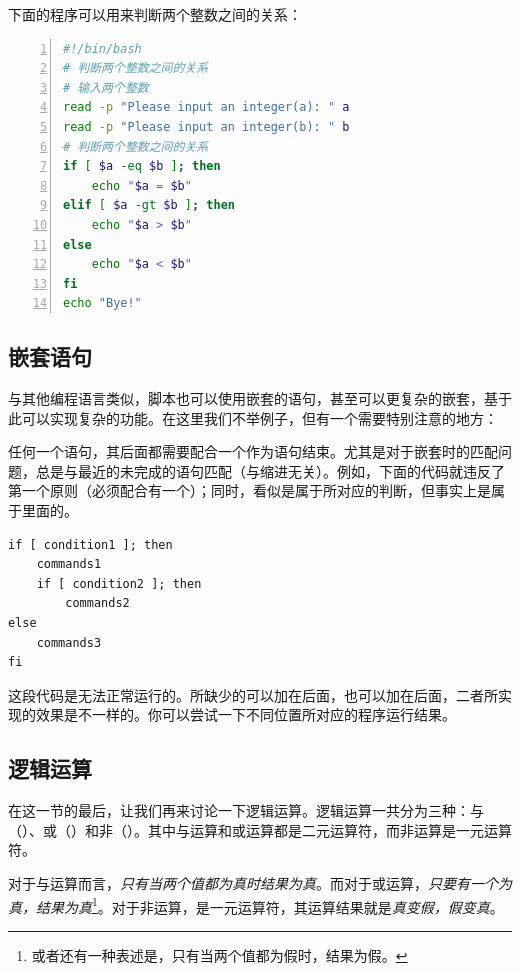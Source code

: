 下面的程序可以用来判断两个整数之间的关系：

\begin{lstlisting}[language=bash,caption=compare\_number,numbers=left]
#!/bin/bash
# 判断两个整数之间的关系
# 输入两个整数
read -p "Please input an integer(a): " a
read -p "Please input an integer(b): " b
# 判断两个整数之间的关系
if [ $a -eq $b ]; then
    echo "$a = $b"
elif [ $a -gt $b ]; then
    echo "$a > $b"
else
    echo "$a < $b"
fi
echo "Bye!"
\end{lstlisting}

\subsection{嵌套语句}\label{subsec:判断语句-嵌套if语句}

与其他编程语言类似，脚本也可以使用嵌套的语句，甚至可以更复杂的嵌套，基于此可以实现复杂的功能。在这里我们不举例子，但有一个需要特别注意的地方：

\begin{attention}
    任何一个语句，其后面都需要配合一个作为语句结束。尤其是对于嵌套时的匹配问题，总是与最近的未完成的语句匹配（与缩进无关）。例如，下面的代码就违反了第一个原则（必须配合有一个）；同时，看似是属于所对应的判断，但事实上是属于里面的。

    \begin{lstlisting}
if [ condition1 ]; then
    commands1
    if [ condition2 ]; then
        commands2
else
    commands3
fi
    \end{lstlisting}

    这段代码是无法正常运行的。所缺少的可以加在后面，也可以加在后面，二者所实现的效果是不一样的。你可以尝试一下不同位置所对应的程序运行结果。

\end{attention}

\subsection{逻辑运算}\label{subsec:判断语句-逻辑运算}

在这一节的最后，让我们再来讨论一下逻辑运算。逻辑运算一共分为三种：与（）、或（）和非（）。其中与运算和或运算都是二元运算符，而非运算是一元运算符。

对于与运算而言，\emph{只有当两个值都为真时结果为真}。而对于或运算，\emph{只要有一个为真，结果为真}\footnote{或者还有一种表述是，只有当两个值都为假时，结果为假。}。对于非运算，是一元运算符，其运算结果就是\emph{真变假，假变真}。

